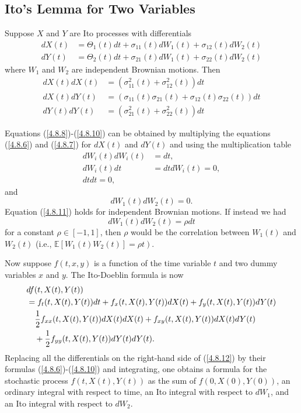 \documentclass[\topdir/lecture\_notes.tex]{subfiles}
\begin{document}
\subsection{Ito's Lemma for Two Variables}
Suppose \(X\) and \(Y\) are Ito processes with differentials
\begin{align}
d X(t) & =\Theta_{1}(t) d t+\sigma_{11}(t) d W_{1}(t)+\sigma_{12}(t) d W_{2}(t)  \label{4.8.6}\\
d Y(t) & =\Theta_{2}(t) d t+\sigma_{21}(t) d W_{1}(t)+\sigma_{22}(t) d W_{2}(t)
 \label{4.8.7}
\end{align}
where \(W_{1}\) and \(W_{2}\) are independent Brownian motions. Then
\begin{align}
d X(t) d X(t) & =\left(\sigma_{11}^{2}(t)+\sigma_{12}^{2}(t)\right) d t  \label{4.8.8}\\
d X(t) d Y(t) & =\left(\sigma_{11}(t) \sigma_{21}(t)+\sigma_{12}(t) \sigma_{22}(t)\right) d t  \label{4.8.9}\\
d Y(t) d Y(t) & =\left(\sigma_{21}^{2}(t)+\sigma_{22}^{2}(t)\right) d t
\label{4.8.10}
\end{align} 

Equations (\ref{4.8.8})-(\ref{4.8.10}) can be obtained by multiplying the equations (\ref{4.8.6}) and (\ref{4.8.7}) for \(dX(t)\) and \(dY(t)\) and using the multiplication table
\begin{align*}
d W_{i}(t) d W_{i}(t)&=d t,\\
d W_{i}(t) d t&=d t d W_{i}(t)=0,\\
d t d t=0,
\end{align*}
and
\begin{equation}
d W_{1}(t) d W_{2}(t)=0. \label{4.8.11}
\end{equation}
Equation (\ref{4.8.11}) holds for independent Brownian motions. If instead we had
\begin{equation*}
d W_{1}(t) d W_{2}(t)=\rho d t
\end{equation*}
for a constant \(\rho \in[-1,1]\), then \(\rho\) would be the correlation between \(W_{1}(t)\) and \(W_{2}(t)\) (i.e., \(\left.\mathbb{E}\left[W_{1}(t) W_{2}(t)\right]=\rho t\right)\).

Now suppose \(f(t, x, y)\) is a function of the time variable \(t\) and two dummy variables \(x\) and \(y\). The Ito-Doeblin formula is now
\begin{align}
& d f(t, X(t), Y(t)) \notag \\
& =f_{t}(t, X(t), Y(t)) d t+f_{x}(t, X(t), Y(t)) d X(t)+f_{y}(t, X(t), Y(t)) d Y(t) \notag\\
& \quad \frac{1}{2} f_{x x}(t, X(t), Y(t)) d X(t) d X(t)+f_{x y}(t, X(t), Y(t)) d X(t) d Y(t) \notag\\
& \quad+\frac{1}{2} f_{y y}(t, X(t), Y(t)) d Y(t) d Y(t).
\label{4.8.12}
\end{align}
Replacing all the differentials on the right-hand side of (\ref{4.8.12}) by their formulas (\ref{4.8.6})-(\ref{4.8.10}) and integrating, one obtains a formula for the stochastic process \(f(t, X(t), Y(t))\) as the sum of \(f(0, X(0), Y(0))\), an ordinary integral with respect to time, an Ito integral with respect to \(dW_{1}\), and an Ito integral with respect to \(dW_{2}\).
\end{document}
